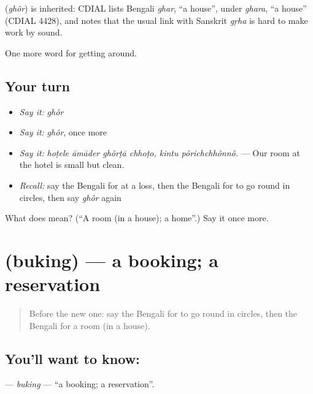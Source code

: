 \begin{cousinweb}
\textbf{} (\emph{ghôr}) is inherited: CDIAL lists Bengali \emph{ghar}, \textquotedblleft{}a house\textquotedblright{}, under \emph{ghara}, \textquotedblleft{}a house\textquotedblright{} (CDIAL 4428), and notes that the usual link with Sanskrit \emph{gṛha} is hard to make work by sound.
\end{cousinweb}

\begin{grammarlens}[title={What you've built}]
One more word for getting around.
\end{grammarlens}

\subsection*{Your turn}
\begin{itemize}
\raggedright
  \item \emph{Say it:} \emph{ghôr}
  \item \emph{Say it:} \emph{ghôr}, once more
  \item \emph{Say it:} \emph{hoṭele āmāder ghôrṭā chhoṭo, kintu pôrichchhônnô.} — Our room at the hotel is small but clean.
  \item \emph{Recall:} say the Bengali for at a loss, then the Bengali for to go round in circles, then say \emph{ghôr} again
\end{itemize}

\begin{tcolorbox}[breakable,colback=teal!4,colframe=teal!35!black,title={Before you move on}]
What does  mean? (\textquotedblleft{}A room (in a house); a home\textquotedblright{}.) Say it once more.
\end{tcolorbox}
\section[\texorpdfstring{\bn{বুকিং} (buking)}{বুকিং (buking)}]{ (buking) — a booking; a reservation}

\label{lesson:BN-C403-buking}



\begin{quote}
Before the new one: say the Bengali for to go round in circles, then the Bengali for a room (in a house).
\end{quote}

\subsection*{You'll want to know: }
\textbf{} — \emph{buking} — \textquotedblleft{}a booking; a reservation\textquotedblright{}.

